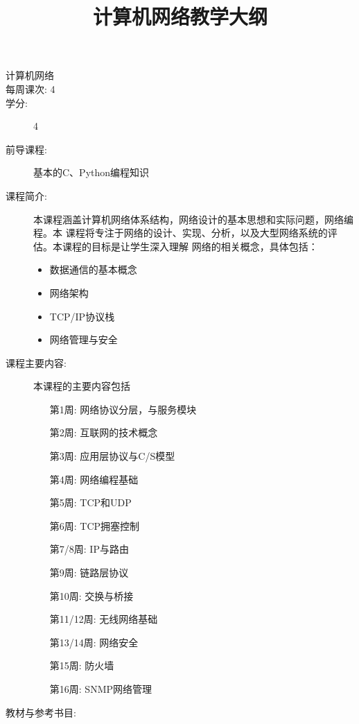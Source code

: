 \documentclass{wx672article} %
\title{计算机网络教学大纲}
\author{}\date{}
\begin{document}

\begin{description}
\item[计算机网络]
\item[每周课次: 4]
\item[学分:] 4
\item[前导课程:] 基本的C、Python编程知识
\item[课程简介:] 本课程涵盖计算机网络体系结构，网络设计的基本思想和实际问题，网络编程。本
  课程将专注于网络的设计、实现、分析，以及大型网络系统的评估。本课程的目标是让学生深入理解
  网络的相关概念，具体包括：
  \begin{itemize}
  \item 数据通信的基本概念
  \item 网络架构
  \item TCP/IP协议栈
  \item 网络管理与安全
  \end{itemize}
\item[课程主要内容:] 本课程的主要内容包括
  \begin{itemize}
  \item[第1周:] 网络协议分层，与服务模块
  \item[第2周:] 互联网的技术概念
  \item[第3周:] 应用层协议与C/S模型
  \item[第4周:] 网络编程基础
  \item[第5周:] TCP和UDP
  \item[第6周:] TCP拥塞控制
  \item[第7/8周:] IP与路由
  \item[第9周:] 链路层协议
  \item[第10周:] 交换与桥接
  \item[第11/12周:] 无线网络基础
  \item[第13/14周:] 网络安全
  \item[第15周:] 防火墙
  \item[第16周:] SNMP网络管理
  \end{itemize}
\item[教材与参考书目:]\hfill
  \nocite{tanenbaum2011computer,fall2011tcp,kurose2013computer,bautts2005linux,hunt2002tcp,hall2009beej}
  \printbibliography[heading=none]{}
\end{description}
\end{document}
